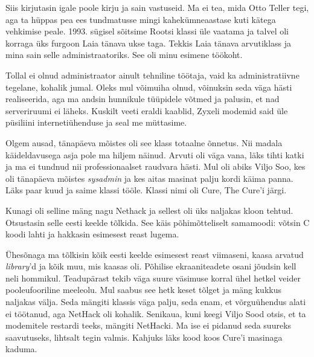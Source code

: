 Siis kirjutasin igale poole kirju ja sain vastuseid. Ma ei tea, mida Otto 
Teller tegi, aga ta hüppas pea ees tundmatusse mingi kahekümneaastase 
kuti kätega vehkimise peale. 1993. sügisel sõitsime Rootsi klassi 
üle vaatama ja talvel oli korraga üks furgoon 
Laia tänava ukse taga. Tekkis Laia tänava arvutiklass ja mina sain selle administraatoriks. See oli minu 
esimene töökoht.

Tollal ei olnud administraator ainult tehniline töötaja, vaid ka 
administratiivne tegelane, kohalik jumal. Oleks mul võimuiha olnud, 
võinuksin seda väga hästi realiseerida, aga ma andsin hunnikule tüüpidele 
võtmed ja palusin, et nad serveriruumi ei läheks. Kuskilt 
veeti eraldi kaablid, Zyxeli modemid said üle püsiliini 
internetiühenduse ja seal me müttasime.

Olgem ausad, tänapäeva mõistes oli see klass totaalne õnnetus. Nii 
madala käideldavusega asja pole ma hiljem näinud. Arvuti oli väga 
vana, läks tihti katki ja ma ei tundnud nii professionaalset raudvara hästi. Mul oli abiks Viljo 
Soo, kes oli tänapäeva mõistes \emph{sysadmin} ja kes 
aitas masinat palju kordi käima panna. Läks paar kuud ja 
saime klassi tööle. Klassi nimi oli Cure, 
The Cure'i järgi. 

Kunagi oli selline mäng nagu Nethack\label{sisu:nethack} ja sellest oli 
üks naljakas kloon tehtud. Otsustasin selle eesti keelde 
tõlkida. See käis põhimõtteliselt samamoodi: võtsin C koodi lahti ja 
hakkasin esimesest reast lugema.


Ühesõnaga ma tõlkisin kõik eesti keelde esimesest reast viimaseni, kaasa arvatud \emph{library}'d ja kõik muu, mis kaasas oli. Põhilise ekraaniteadete osani jõudsin 
kell neli hommikul. Teadupärast tekib väga suure väsimuse korral ühel hetkel veider pooleufooriline meeleolu. Mul saabus see hetk keset tõlget ja mäng kukkus
naljakas välja. Seda mängiti klassis väga palju, seda enam, et 
võrguühendus alati ei töötanud, aga NetHack oli kohalik. Senikaua, 
kuni keegi Viljo Sood otsis, et ta 
modemitele restardi teeks, mängiti NetHacki. Ma ise ei pidanud seda suureks saavutuseks, lihtsalt tegin valmis. Kahjuks läks kood koos Cure'i 
masinaga kaduma.

